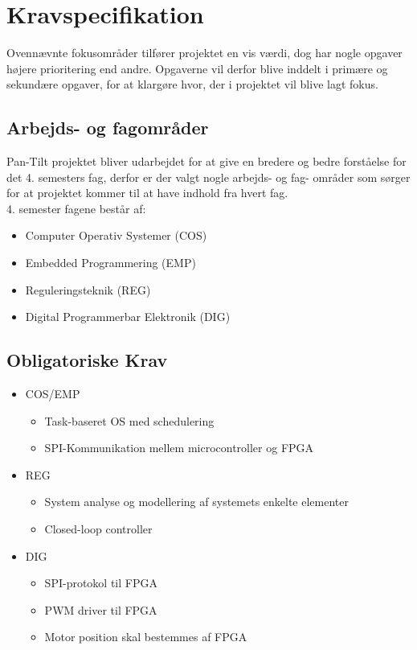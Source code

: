 \section{Kravspecifikation}

Ovennævnte fokusområder tilfører projektet en vis værdi, dog har nogle opgaver højere prioritering end andre. Opgaverne vil derfor blive inddelt i primære og sekundære opgaver, for at klargøre hvor, der i projektet vil blive lagt fokus.

\subsection{Arbejds- og fagområder}
Pan-Tilt projektet bliver udarbejdet for at give en bredere og bedre forståelse for det 4. semesters fag, derfor er der valgt nogle arbejds- og fag- områder som sørger for at projektet kommer til at have indhold fra hvert fag.\\
4. semester fagene består af:
\begin{itemize}[noitemsep]
	\item Computer Operativ Systemer (COS)
	\item Embedded Programmering (EMP)
	\item Reguleringsteknik (REG)
	\item Digital Programmerbar Elektronik (DIG)
\end{itemize}

\subsection{Obligatoriske Krav}

\begin{itemize}[noitemsep]
	\item COS/EMP
	\begin{itemize}[noitemsep]
		\item Task-baseret OS med schedulering
		\item SPI-Kommunikation mellem microcontroller og FPGA
	\end{itemize}
	\item REG
	\begin{itemize}[noitemsep]
		\item System analyse og modellering af systemets enkelte elementer
		\item Closed-loop controller
	\end{itemize}
	\item DIG
	\begin{itemize}[noitemsep]
		\item SPI-protokol til FPGA
		\item PWM driver til FPGA
		\item Motor position skal bestemmes af FPGA
	\end{itemize}
\end{itemize}

